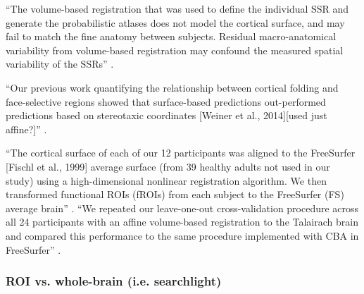 

``The volume-based registration that was used to define the individual SSR and
generate the probabilistic atlases does not model the cortical surface,
and may fail to match the fine anatomy between subjects.
%
Residual macro-anatomical variability from volume-based registration may
confound the measured spatial variability of the SSRs''
\citep{zhen2017quantifying}.


``Our previous work quantifying the relationship between cortical folding and
face-selective regions showed that surface-based predictions out-performed
predictions based on stereotaxic coordinates [Weiner et al., 2014][used just
affine?]'' \citep{weiner2018defining}.

``The cortical surface of each of our 12 participants was aligned to the
FreeSurfer [Fischl et al., 1999] average surface (from 39 healthy adults not
used in our study) using a high-dimensional nonlinear registration algorithm.
%
We then transformed functional ROIs (fROIs) from each subject to the FreeSurfer
(FS) average brain'' \citep{weiner2018defining}.
%
``We repeated our leave-one-out cross-validation procedure across all 24
participants with an affine volume-based registration to the Talairach brain and
compared this performance to the same procedure implemented with CBA in
FreeSurfer'' \citep{weiner2018defining}.





\subsubsection{ROI vs. whole-brain (i.e. searchlight)}

